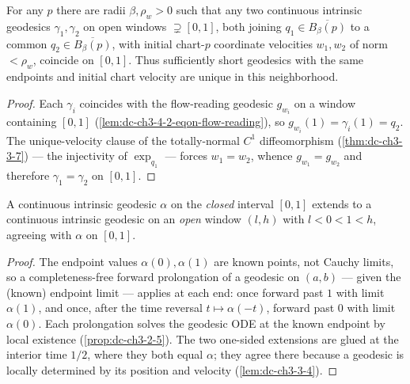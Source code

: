 \begin{lemma}
  \label{lem:dc-ch3-4-2-uniqueness-engine}
  \leanok
  For any $p$ there are radii $\beta,\rho_w>0$ such that any two continuous intrinsic geodesics
  $\gamma_1,\gamma_2$ on open windows $\supsetneq[0,1]$, both joining $q_1\in\overline{B_\beta(p)}$ to
  a common $q_2\in\overline{B_\beta(p)}$, with initial chart-$p$ coordinate velocities $w_1,w_2$ of
  norm $<\rho_w$, coincide on $[0,1]$. Thus sufficiently short geodesics with
  the same endpoints and initial chart velocity are unique in this neighborhood.
\end{lemma}
\begin{proof}
  \sketch
  \leanok
  Each $\gamma_i$ coincides with the flow-reading geodesic $g_{w_i}$ on a window containing $[0,1]$
  (\cref{lem:dc-ch3-4-2-eqon-flow-reading}), so $g_{w_i}(1)=\gamma_i(1)=q_2$. The unique-velocity
  clause of the totally-normal $C^1$ diffeomorphism (\cref{thm:dc-ch3-3-7}) --- the injectivity
  of $\exp_{q_1}$ --- forces $w_1=w_2$, whence $g_{w_1}=g_{w_2}$ and therefore $\gamma_1=\gamma_2$ on
  $[0,1]$.
\end{proof}

\begin{lemma}
  \label{lem:dc-ch3-4-2-window}
  \leanok
  A continuous intrinsic geodesic $\alpha$ on the \emph{closed} interval $[0,1]$ extends to a
  continuous intrinsic geodesic on an \emph{open} window $(l,h)$ with $l<0<1<h$, agreeing with
  $\alpha$ on $[0,1]$.
\end{lemma}
\begin{proof}
  \sketch
  \leanok
  The endpoint values $\alpha(0),\alpha(1)$ are known points, not Cauchy limits, so a
  completeness-free forward prolongation of a geodesic on $(a,b)$ --- given the (known) endpoint
  limit --- applies at each end: once forward past $1$ with limit $\alpha(1)$, and once, after the
  time reversal $t\mapsto\alpha(-t)$, forward past $0$ with limit $\alpha(0)$. Each prolongation
  solves the geodesic ODE at the known endpoint by local existence (\cref{prop:dc-ch3-2-5}). The two
  one-sided extensions are glued at the interior time $1/2$, where they both equal $\alpha$; they
  agree there because a geodesic is locally determined by its position and velocity
  (\cref{lem:dc-ch3-3-4}).
\end{proof}

